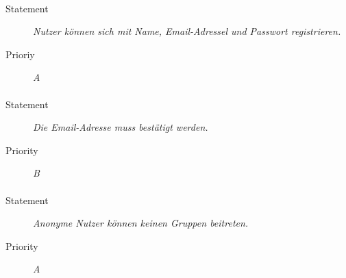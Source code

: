 \paragraph{}
\begin{description}
  \item [Statement]
    \textit{Nutzer können sich mit Name, Email-Adressel und Passwort registrieren.}
  \item [Prioriy] \textit{A}
\end{description}

\paragraph{}
\begin{description}
  \item [Statement] 
    \textit{Die Email-Adresse muss bestätigt werden.}
  \item [Priority] \textit{B}
\end{description}

\paragraph{}
\begin{description}
  \item [Statement] 
    \textit{Anonyme Nutzer können keinen Gruppen beitreten.}
  \item [Priority] \textit{A}
\end{description}
